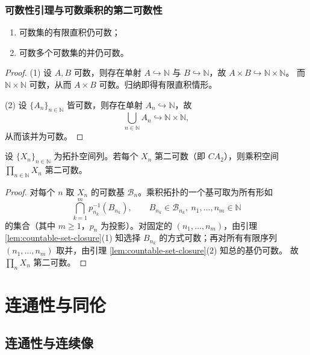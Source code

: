 \documentclass[lang=cn,a4paper,newtx,figureplace=section,tableplace=section]{elegantbook}
\begin{document}
\subsection{可数性引理与可数乘积的第二可数性}

\begin{lemma}\label{lem:countable-set-closure}
  \begin{enumerate}
    \item 可数集的有限直积仍可数；
    \item 可数多个可数集的并仍可数。
  \end{enumerate}
\end{lemma}
\begin{proof}
  (1) 设 $A,B$ 可数，则存在单射 $A\hookrightarrow\mathbb N$ 与 $B\hookrightarrow\mathbb N$，故 $A\times B\hookrightarrow\mathbb N\times\mathbb N$。
  而 $\mathbb N\times\mathbb N$ 可数，从而 $A\times B$ 可数。归纳即得有限直积情形。

  (2) 设 $\{A_n\}_{n\in\mathbb N}$ 皆可数，则存在单射 $A_n\hookrightarrow\mathbb N$，故
  \[
    \bigcup_{n\in\mathbb N}A_n\hookrightarrow\mathbb N\times\mathbb N,
  \]
  从而该并为可数。
\end{proof}

\begin{proposition}\label{prop:countable-product-ca2}
  设 $\{X_n\}_{n\in\mathbb N}$ 为拓扑空间列。若每个 $X_n$ 第二可数（即 $CA_2$），则乘积空间 $\prod_{n\in\mathbb N}X_n$ 第二可数。
\end{proposition}
\begin{proof}
  对每个 $n$ 取 $X_n$ 的可数基 $\mathcal B_n$。乘积拓扑的一个基可取为所有形如
  \[
    \bigcap_{k=1}^m p_{n_k}^{-1}(B_{n_k}),\qquad B_{n_k}\in\mathcal B_{n_k},\ n_1,\dots,n_m\in\mathbb N
  \]
  的集合（其中 $m\ge 1$，$p_n$ 为投影）。对固定的 $(n_1,\dots,n_m)$，由引理 \ref{lem:countable-set-closure}(1) 知选择 $B_{n_k}$ 的方式可数；再对所有有限序列 $(n_1,\dots,n_m)$ 取并，由引理 \ref{lem:countable-set-closure}(2) 知总的基仍可数。
  故 $\prod_n X_n$ 第二可数。
  \end{proof}

\chapter{连通性与同伦}

\section{连通性与连续像}
\end{document}
